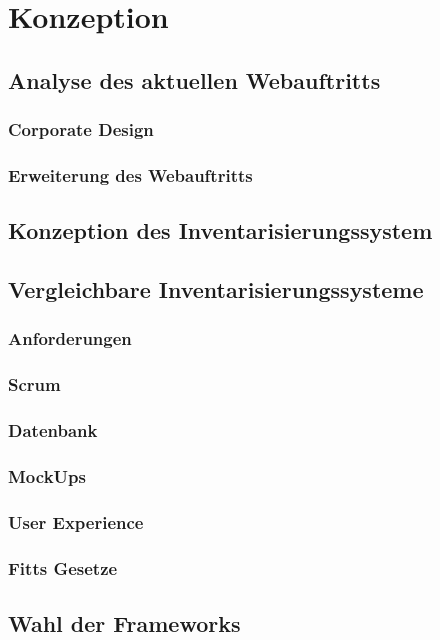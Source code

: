 \chapter{Konzeption}
\label{cha:konzeption}


\section{Analyse des aktuellen Webauftritts}
\label{webauftritt}
 

\subsection{Corporate Design}



\subsection{Erweiterung des Webauftritts}

\section{Konzeption des Inventarisierungssystem}
\label{inventar}


\section{Vergleichbare Inventarisierungssysteme}

\subsection{Anforderungen}


\subsection{Scrum}

\subsection{Datenbank}

\subsection{MockUps}

\subsection{User Experience}

\subsection{Fitts Gesetze}

\section{Wahl der Frameworks}

